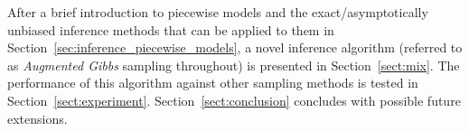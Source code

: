 



After a brief introduction to piecewise models and the
exact/asymptotically unbiased inference methods that can be applied to 
them in Section~\ref{sec:inference_piecewise_models}, a novel inference 
algorithm (referred to as \emph{Augmented Gibbs} sampling throughout)
is presented in Section~\ref{sect:mix}.  The performance of this
algorithm against other sampling methods is tested in
Section~\ref{sect:experiment}.
Section~\ref{sect:conclusion} concludes with possible future extensions.
